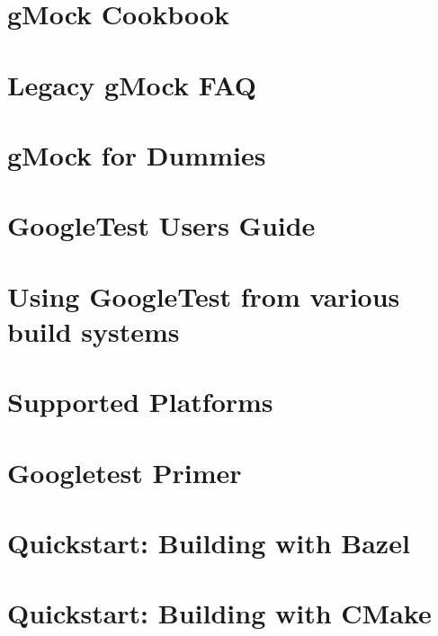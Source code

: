 \let\mypdfximage\pdfximage\def\pdfximage{\immediate\mypdfximage}\documentclass[twoside]{book}
\newcommand{\+}{\discretionary{\mbox{\scriptsize$\hookleftarrow$}}{}{}}
\begin{document}
\chapter{g\+Mock Cookbook}
\label{md_googletest_docs_gmock_cook_book}

\chapter{Legacy g\+Mock FAQ}
\label{md_googletest_docs_gmock_faq}

\chapter{g\+Mock for Dummies}
\label{md_googletest_docs_gmock_for_dummies}

\chapter{Google\+Test User\textquotesingle{}s Guide}
\label{md_googletest_docs_index}

\chapter{Using Google\+Test from various build systems}
\label{md_googletest_docs_pkgconfig}

\chapter{Supported Platforms}
\label{md_googletest_docs_platforms}

\chapter{Googletest Primer}
\label{md_googletest_docs_primer}

\chapter{Quickstart\+: Building with Bazel}
\label{md_googletest_docs_quickstart_bazel}

\chapter{Quickstart\+: Building with CMake}
\label{md_googletest_docs_quickstart_cmake}

\end{document}
